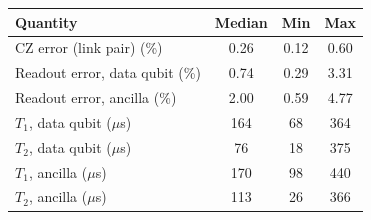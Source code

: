 \begin{tabular}{lccc}
\toprule
Quantity & Median & Min & Max \\
\midrule
CZ error (link pair) (\%) & 0.26 & 0.12 & 0.60 \\
Readout error, data qubit (\%) & 0.74 & 0.29 & 3.31 \\
Readout error, ancilla (\%) & 2.00 & 0.59 & 4.77 \\
$T_1$, data qubit ($\mu$s) & 164 & 68 & 364 \\
$T_2$, data qubit ($\mu$s) & 76 & 18 & 375 \\
$T_1$, ancilla ($\mu$s) & 170 & 98 & 440 \\
$T_2$, ancilla ($\mu$s) & 113 & 26 & 366 \\
\bottomrule
\end{tabular}
